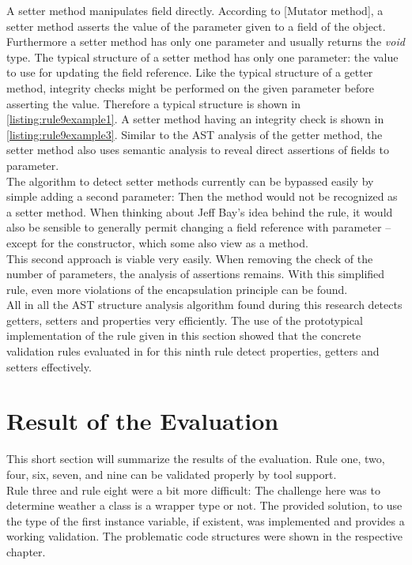 A setter method manipulates field directly. According to \cite{wiki}[Mutator method], a setter method asserts the value of the parameter given to a field of the object. Furthermore a setter method has only one parameter and usually returns the \textit{void} type. The typical structure of a setter method has only one parameter: the value to use for updating the field reference. Like the typical structure of a getter method, integrity checks might be performed on the given parameter before asserting the value. Therefore a typical structure is shown in \ref{listing:rule9example1}. A setter method having an integrity check is shown in \ref{listing:rule9example3}. Similar to the \acf{AST} analysis of the getter method, the setter method also uses semantic analysis to reveal direct assertions of fields to parameter.
\\

The algorithm to detect setter methods currently can be bypassed easily by simple adding a second parameter: Then the method would not be recognized as a setter method. When thinking about Jeff Bay's idea behind the rule, it would also be sensible to generally permit changing a field reference with parameter -- except for the constructor, which some also view as a method. 
\\

This second approach is viable very easily. When removing the check of the number of parameters, the analysis of assertions remains. With this simplified rule, even more violations of the encapsulation principle can be found. 
\\

All in all the \acf{AST} structure analysis algorithm found during this research detects getters, setters and properties very efficiently. The use of the prototypical implementation of the rule given in this section showed that the concrete validation rules evaluated in for this ninth rule detect properties, getters and setters effectively. 

\section{Result of the Evaluation}
\label{e:result}
This short section will summarize the results of the evaluation. Rule one, two, four, six, seven, and nine can be validated properly by tool support. 
\\

Rule three and rule eight were a bit more difficult: The challenge here was to determine weather a class is a wrapper type or not. The provided solution, to use the type of the first instance variable, if existent, was implemented and provides a working validation. The problematic code structures were shown in the respective chapter.
\\

